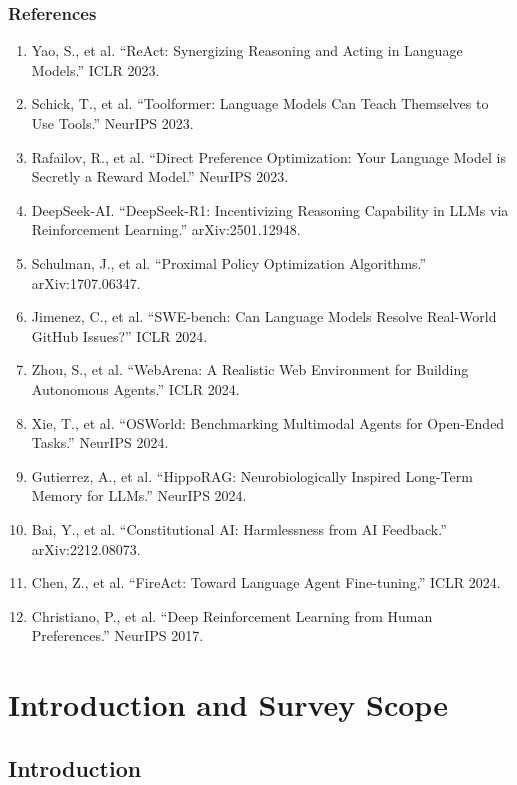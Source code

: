 \documentclass[12pt,a4paper]{report}
\theoremstyle{definition}
\begin{document}
\section*{References}

\begin{enumerate}
    \item Yao, S., et al. ``ReAct: Synergizing Reasoning and Acting in Language Models.'' ICLR 2023.
    \item Schick, T., et al. ``Toolformer: Language Models Can Teach Themselves to Use Tools.'' NeurIPS 2023.
    \item Rafailov, R., et al. ``Direct Preference Optimization: Your Language Model is Secretly a Reward Model.'' NeurIPS 2023.
    \item DeepSeek-AI. ``DeepSeek-R1: Incentivizing Reasoning Capability in LLMs via Reinforcement Learning.'' arXiv:2501.12948.
    \item Schulman, J., et al. ``Proximal Policy Optimization Algorithms.'' arXiv:1707.06347.
    \item Jimenez, C., et al. ``SWE-bench: Can Language Models Resolve Real-World GitHub Issues?'' ICLR 2024.
    \item Zhou, S., et al. ``WebArena: A Realistic Web Environment for Building Autonomous Agents.'' ICLR 2024.
    \item Xie, T., et al. ``OSWorld: Benchmarking Multimodal Agents for Open-Ended Tasks.'' NeurIPS 2024.
    \item Gutierrez, A., et al. ``HippoRAG: Neurobiologically Inspired Long-Term Memory for LLMs.'' NeurIPS 2024.
    \item Bai, Y., et al. ``Constitutional AI: Harmlessness from AI Feedback.'' arXiv:2212.08073.
    \item Chen, Z., et al. ``FireAct: Toward Language Agent Fine-tuning.'' ICLR 2024.
    \item Christiano, P., et al. ``Deep Reinforcement Learning from Human Preferences.'' NeurIPS 2017.
\end{enumerate}

\part{Introduction and Survey Scope}

\chapter{Introduction}
\label{ch:introduction}
\end{document}
